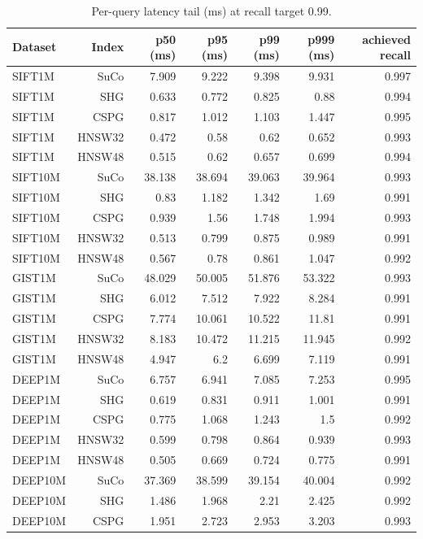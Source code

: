 \begin{table}[t]
\centering
\small
\caption{Per-query latency tail (ms) at recall target 0.99.}
\label{tab:latency-tail-r99}
\begin{tabular}{lrrrrrr}
\toprule
Dataset & Index & p50 (ms) & p95 (ms) & p99 (ms) & p999 (ms) & achieved recall \\
\midrule
SIFT1M & SuCo & 7.909 & 9.222 & 9.398 & 9.931 & 0.997 \\
SIFT1M & SHG & 0.633 & 0.772 & 0.825 & 0.88 & 0.994 \\
SIFT1M & CSPG & 0.817 & 1.012 & 1.103 & 1.447 & 0.995 \\
SIFT1M & HNSW32 & 0.472 & 0.58 & 0.62 & 0.652 & 0.993 \\
SIFT1M & HNSW48 & 0.515 & 0.62 & 0.657 & 0.699 & 0.994 \\
SIFT10M & SuCo & 38.138 & 38.694 & 39.063 & 39.964 & 0.993 \\
SIFT10M & SHG & 0.83 & 1.182 & 1.342 & 1.69 & 0.991 \\
SIFT10M & CSPG & 0.939 & 1.56 & 1.748 & 1.994 & 0.993 \\
SIFT10M & HNSW32 & 0.513 & 0.799 & 0.875 & 0.989 & 0.991 \\
SIFT10M & HNSW48 & 0.567 & 0.78 & 0.861 & 1.047 & 0.992 \\
GIST1M & SuCo & 48.029 & 50.005 & 51.876 & 53.322 & 0.993 \\
GIST1M & SHG & 6.012 & 7.512 & 7.922 & 8.284 & 0.991 \\
GIST1M & CSPG & 7.774 & 10.061 & 10.522 & 11.81 & 0.991 \\
GIST1M & HNSW32 & 8.183 & 10.472 & 11.215 & 11.945 & 0.992 \\
GIST1M & HNSW48 & 4.947 & 6.2 & 6.699 & 7.119 & 0.991 \\
DEEP1M & SuCo & 6.757 & 6.941 & 7.085 & 7.253 & 0.995 \\
DEEP1M & SHG & 0.619 & 0.831 & 0.911 & 1.001 & 0.991 \\
DEEP1M & CSPG & 0.775 & 1.068 & 1.243 & 1.5 & 0.992 \\
DEEP1M & HNSW32 & 0.599 & 0.798 & 0.864 & 0.939 & 0.993 \\
DEEP1M & HNSW48 & 0.505 & 0.669 & 0.724 & 0.775 & 0.991 \\
DEEP10M & SuCo & 37.369 & 38.599 & 39.154 & 40.004 & 0.992 \\
DEEP10M & SHG & 1.486 & 1.968 & 2.21 & 2.425 & 0.992 \\
DEEP10M & CSPG & 1.951 & 2.723 & 2.953 & 3.203 & 0.993 \\

\end{tabular}
\end{table}
